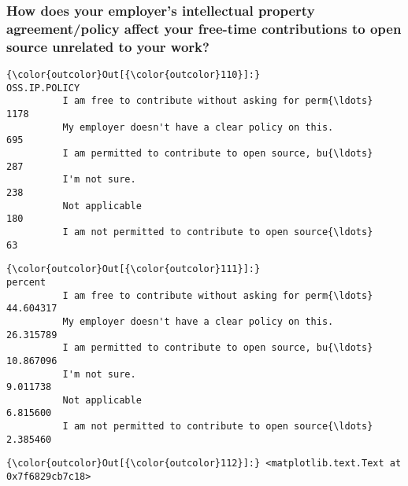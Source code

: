 \documentclass[11pt]{article}
\begin{document}
    \subsubsection{How does your employer's intellectual property
agreement/policy affect your free-time contributions to open source
unrelated to your
work?}\label{how-does-your-employers-intellectual-property-agreementpolicy-affect-your-free-time-contributions-to-open-source-unrelated-to-your-work}


            \begin{Verbatim}[commandchars=\\\{\}]
{\color{outcolor}Out[{\color{outcolor}110}]:}                                                     OSS.IP.POLICY
          I am free to contribute without asking for perm{\ldots}           1178
          My employer doesn't have a clear policy on this.              695
          I am permitted to contribute to open source, bu{\ldots}            287
          I'm not sure.                                                 238
          Not applicable                                                180
          I am not permitted to contribute to open source{\ldots}             63
\end{Verbatim}
        

            \begin{Verbatim}[commandchars=\\\{\}]
{\color{outcolor}Out[{\color{outcolor}111}]:}                                                       percent
          I am free to contribute without asking for perm{\ldots}  44.604317
          My employer doesn't have a clear policy on this.    26.315789
          I am permitted to contribute to open source, bu{\ldots}  10.867096
          I'm not sure.                                        9.011738
          Not applicable                                       6.815600
          I am not permitted to contribute to open source{\ldots}   2.385460
\end{Verbatim}
        

            \begin{Verbatim}[commandchars=\\\{\}]
{\color{outcolor}Out[{\color{outcolor}112}]:} <matplotlib.text.Text at 0x7f6829cb7c18>
\end{Verbatim}
        
    \begin{center}
    \end{center}
    { \hspace*{\fill} \\}
    
\end{document}
